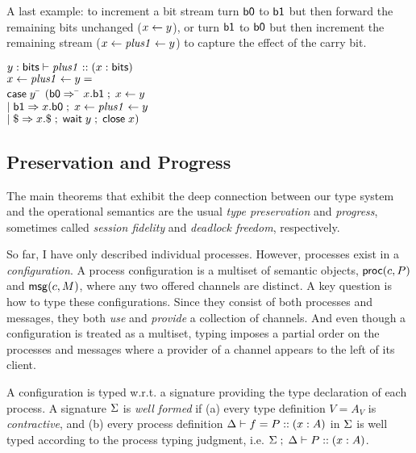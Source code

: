 A last example: to increment a bit stream turn
$\m{b0}$ to $\m{b1}$ but then forward the remaining bits unchanged
($\fwd{x}{y}$), or turn $\m{b1}$ to $\m{b0}$ but then increment
the remaining stream ($\procdef{\mi{plus1}}{y}{x}$) to
capture the effect of the carry bit.
\begin{sill}
$y : \m{bits} \vdash \mi{plus1} :: (x : \m{bits})$ \\
$\procdef{\mi{plus1}}{y}{x} = $ \\
\quad $\casedef{y}$ \= $(\labdef{\m{b0}}$ \= $\esendl{x}{\m{b1}} \semi
\fwd{x}{y}$ \\
\> $\mid \labdef{\m{b1}} \esendl{x}{\m{b0}} \semi
\procdef{\mi{plus1}}{y}{x}$ \\
\> $\mid \labdef{\m{\$}} \esendl{x}{\m{\$}} \semi \ewait{y} \semi
\eclose{x})$
\end{sill}

\subsection{Preservation and Progress}
The main theorems that exhibit the deep connection between our type
system and the operational semantics are the usual \emph{type
  preservation} and \emph{progress}, sometimes called \emph{session
  fidelity} and \emph{deadlock freedom}, respectively.

So far, I have only described individual processes. However, processes
exist in a \emph{configuration}. A process configuration is a multiset
of semantic objects, $\proc{c}{P}$ and $\msg{c}{M}$, where any
two offered channels are distinct. A key question is how to type these
configurations. Since they consist of both processes and messages, they
both \emph{use} and \emph{provide} a collection of channels.
And even though a configuration is treated as a multiset, typing imposes
a partial order on the processes and messages where a provider of a
channel appears to the left of its client.

A configuration is typed w.r.t. a signature providing the type declaration
of each process.
A signature $\Sg$ is \emph{well formed} if
(a) every type definition $V = A_V$ is \emph{contractive},
and (b) every process definition
$\D \vdash f = P :: (x : A)$ in $\Sg$
is well typed according to the process typing judgment, i.e.
$\Sg \semi \D \vdash P :: (x : A)$.

